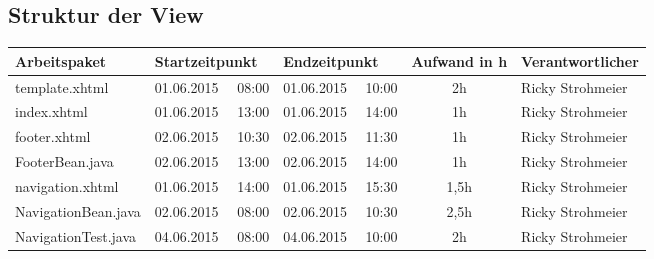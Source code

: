\begin{landscape}
\subsection{Struktur der View}
\begin{tabular}{|p{10cm}|p{3.2cm}|p{3.2cm}|c|p{3.5cm}|}
	\hline  \textbf{Arbeitspaket} & \textbf{Startzeitpunkt} & \textbf{Endzeitpunkt} & \textbf{Aufwand in h} & \textbf{Verantwortlicher} \\ 
	\hline   template.xhtml                   & 01.06.2015 \ \ 08:00     & 01.06.2015 \ \ 10:00     &      2h               & Ricky Strohmeier\\
	\hline   index.xhtml                      & 01.06.2015 \ \ 13:00     & 01.06.2015 \ \ 14:00     &      1h               & Ricky Strohmeier\\
	\hline   footer.xhtml                     & 02.06.2015 \ \ 10:30     & 02.06.2015 \ \ 11:30     &      1h               & Ricky Strohmeier\\ 
	\hline   FooterBean.java                  & 02.06.2015 \ \ 13:00     & 02.06.2015 \ \ 14:00     &      1h               & Ricky Strohmeier\\ 
	\hline   navigation.xhtml                 & 01.06.2015 \ \ 14:00     & 01.06.2015 \ \ 15:30     &      1,5h             & Ricky Strohmeier\\ 
	\hline   NavigationBean.java              & 02.06.2015 \ \ 08:00     & 02.06.2015 \ \ 10:30     &      2,5h             & Ricky Strohmeier\\ 
	\hline   NavigationTest.java              & 04.06.2015 \ \ 08:00     & 04.06.2015 \ \ 10:00     &      2h               & Ricky Strohmeier\\ 
	\hline 
\end{tabular} \ \\
\ \\


\end{landscape}
